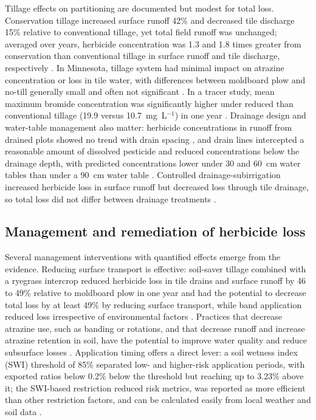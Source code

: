 Tillage effects on partitioning are documented but modest for total loss. Conservation tillage increased surface runoff 42\% and decreased tile discharge 15\% relative to conventional tillage, yet total field runoff was unchanged; averaged over years, herbicide concentration was 1.3 and 1.8 times greater from conservation than conventional tillage in surface runoff and tile discharge, respectively \parencite{GAYNOR1995}. In Minnesota, tillage system had minimal impact on atrazine concentration or loss in tile water, with differences between moldboard plow and no-till generally small and often not significant \parencite{BUHLER1993}. In a tracer study, mean maximum bromide concentration was significantly higher under reduced than conventional tillage (19.9 versus 10.7~mg~L$^{-1}$) in one year \parencite{Fortin2002}. Drainage design and water-table management also matter: herbicide concentrations in runoff from drained plots showed no trend with drain spacing \parencite{SOUTHWICK1990}, and drain lines intercepted a reasonable amount of dissolved pesticide and reduced concentrations below the drainage depth, with predicted concentrations lower under 30 and 60~cm water tables than under a 90~cm water table \parencite{Kalita1998}. Controlled drainage-subirrigation increased herbicide loss in surface runoff but decreased loss through tile drainage, so total loss did not differ between drainage treatments \parencite{Gaynor2001}.

\subsection{Management and remediation of herbicide loss}
Several management interventions with quantified effects emerge from the evidence. Reducing surface transport is effective: soil-saver tillage combined with a ryegrass intercrop reduced herbicide loss in tile drains and surface runoff by 46 to 49\% relative to moldboard plow in one year and had the potential to decrease total loss by at least 49\% by reducing surface transport, while band application reduced loss irrespective of environmental factors \parencite{Gaynor2001}. Practices that decrease atrazine use, such as banding or rotations, and that decrease runoff and increase atrazine retention in soil, have the potential to improve water quality and reduce subsurface losses \parencite{Moorman1999}. Application timing offers a direct lever: a soil wetness index (SWI) threshold of 85\% separated low- and higher-risk application periods, with exported ratios below 0.2\% below the threshold but reaching up to 3.23\% above it; the SWI-based restriction reduced risk metrics, was reported as more efficient than other restriction factors, and can be calculated easily from local weather and soil data \parencite{Julien2023}.

